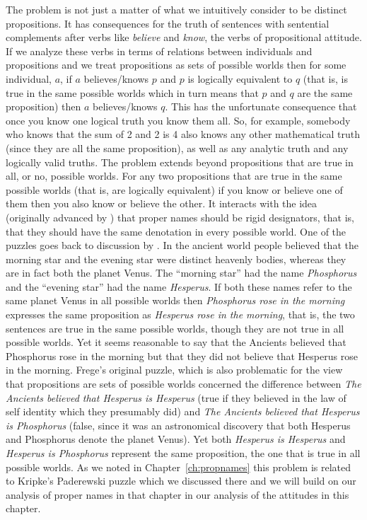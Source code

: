 The problem is not just a matter of what we intuitively consider to be
distinct propositions.  It has consequences for the truth of sentences
with sentential complements after verbs like \textit{believe} and
\textit{know}, the verbs of propositional attitude.  If we analyze
these verbs in terms of relations between individuals and propositions
and we treat propositions as sets of possible worlds then for some
individual, $a$, if $a$ believes/knows $p$ and $p$ is logically
equivalent to $q$ (that is, is true in the same possible worlds which
in turn means that $p$ and $q$ are the same proposition) then $a$
believes/knows $q$.  This has the unfortunate consequence that once
you know one logical truth you know them all. So, for example,
somebody who knows that the sum of 2 and 2 is 4 also knows any other
mathematical truth (since they are all the same proposition), as well
as any analytic truth and any logically valid truths. The problem
extends beyond propositions that are true in all, or no, possible
worlds.  For any two propositions that are true in the same possible
worlds (that is, are logically equivalent) if you know or believe one
of them then you also know or believe the other.  It interacts with
the idea (originally advanced by \citealp{Kripke1972}) that proper
names should be rigid designators, that is, that they should have the
same denotation in every possible world.  One of the puzzles goes back
to discussion by \cite{Frege1892}.  In the ancient world people
believed that the morning star and the evening star were distinct
heavenly bodies, whereas they are in fact both the planet Venus.  The
``morning star'' had the name \textit{Phosphorus} and the ``evening
star'' had the name \textit{Hesperus}.  If both these names refer
to the same planet Venus in all possible worlds then
\textit{Phosphorus rose in the morning} expresses the same proposition
as \textit{Hesperus rose in the morning}, that is, the two sentences
are true in the same possible worlds, though they are not true in all
possible worlds.  Yet it seems reasonable to say that the Ancients
believed that Phosphorus rose in the morning but that they did not
believe that Hesperus rose in the morning.  Frege's original puzzle,
which is also problematic for the view that propositions are sets of
possible worlds concerned the difference between \textit{The Ancients
  believed that Hesperus is Hesperus} (true if they believed in the
law of self identity which they presumably did) and \textit{The
  Ancients believed that Hesperus is Phosphorus} (false, since it was
an astronomical discovery that both Hesperus and Phosphorus denote the
planet Venus).  Yet both \textit{Hesperus is Hesperus} and
\textit{Hesperus is Phosphorus} represent the same proposition, the
one that is true in all possible worlds.  As we noted in Chapter~\ref{ch:propnames} this problem
is related to Kripke's Paderewski puzzle which we discussed there and
we will build on our analysis of proper names in that chapter in our
analysis of the attitudes in this chapter.

